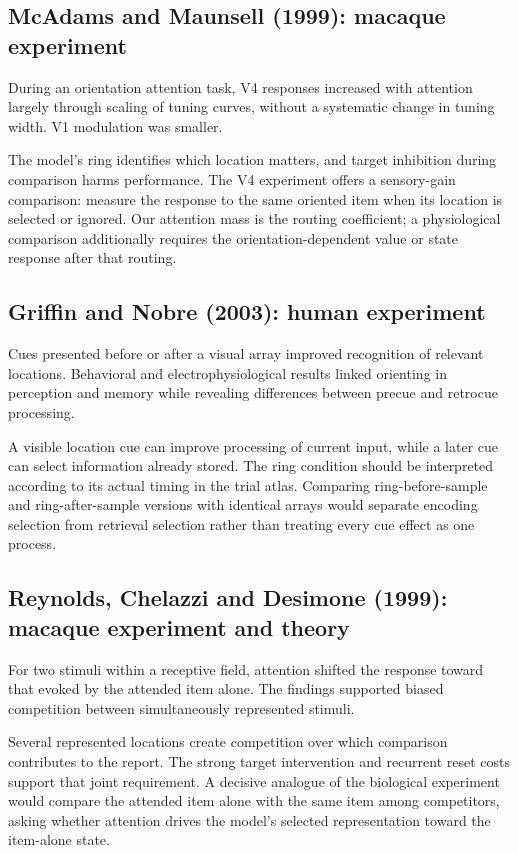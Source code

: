 \documentclass[11pt]{article}
\begin{document}
\subsection{McAdams and Maunsell (1999): macaque experiment}
During an orientation attention task, V4 responses increased with attention largely through scaling of tuning curves, without a systematic change in tuning width. V1 modulation was smaller. \cite{bio_mcadams}

The model’s ring identifies which location matters, and target inhibition during comparison harms performance. The V4 experiment offers a sensory-gain comparison: measure the response to the same oriented item when its location is selected or ignored. Our attention mass is the routing coefficient; a physiological comparison additionally requires the orientation-dependent value or state response after that routing.

\subsection{Griffin and Nobre (2003): human experiment}
Cues presented before or after a visual array improved recognition of relevant locations. Behavioral and electrophysiological results linked orienting in perception and memory while revealing differences between precue and retrocue processing. \cite{bio_griffin}

A visible location cue can improve processing of current input, while a later cue can select information already stored. The ring condition should be interpreted according to its actual timing in the trial atlas. Comparing ring-before-sample and ring-after-sample versions with identical arrays would separate encoding selection from retrieval selection rather than treating every cue effect as one process.

\subsection{Reynolds, Chelazzi and Desimone (1999): macaque experiment and theory}
For two stimuli within a receptive field, attention shifted the response toward that evoked by the attended item alone. The findings supported biased competition between simultaneously represented stimuli. \cite{bio_competition}

Several represented locations create competition over which comparison contributes to the report. The strong target intervention and recurrent reset costs support that joint requirement. A decisive analogue of the biological experiment would compare the attended item alone with the same item among competitors, asking whether attention drives the model’s selected representation toward the item-alone state.
\end{document}
